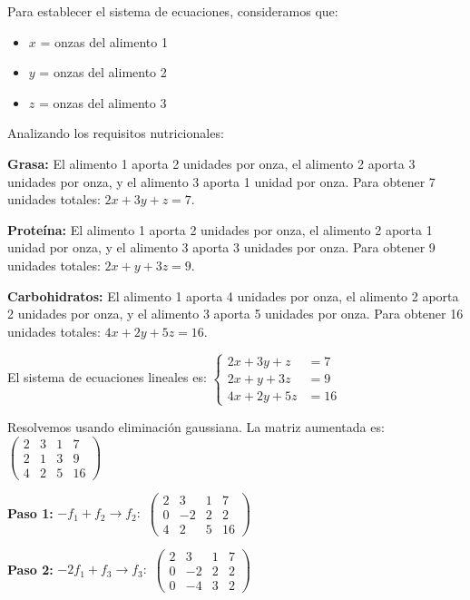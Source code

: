 \begin{myproof}
Para establecer el sistema de ecuaciones, consideramos que:
\begin{itemize}
\item $x$ = onzas del alimento 1
\item $y$ = onzas del alimento 2
\item $z$ = onzas del alimento 3
\end{itemize}

Analizando los requisitos nutricionales:

\textbf{Grasa:} El alimento 1 aporta 2 unidades por onza, el alimento 2 aporta 3 unidades por onza, y el alimento 3 aporta 1 unidad por onza. Para obtener 7 unidades totales: $2x + 3y + z = 7.$

\textbf{Proteína:} El alimento 1 aporta 2 unidades por onza, el alimento 2 aporta 1 unidad por onza, y el alimento 3 aporta 3 unidades por onza. Para obtener 9 unidades totales: $2x + y + 3z = 9.$

\textbf{Carbohidratos:} El alimento 1 aporta 4 unidades por onza, el alimento 2 aporta 2 unidades por onza, y el alimento 3 aporta 5 unidades por onza. Para obtener 16 unidades totales: $4x + 2y + 5z = 16.$

El sistema de ecuaciones lineales es:  $\begin{cases}
2x + 3y + z &= 7\\
2x + y + 3z &= 9\\
4x + 2y + 5z &= 16
\end{cases}$

Resolvemos usando eliminación gaussiana. La matriz aumentada es: $\left(\begin{array}{ccc|c}
2 & 3 & 1 & 7 \\
2 & 1 & 3 & 9 \\
4 & 2 & 5 & 16
\end{array}\right)$

\textbf{Paso 1:} $-f_1 + f_2 \to f_2:$ $\left(\begin{array}{ccc|c}
2 & 3 & 1 & 7 \\
0 & -2 & 2 & 2 \\
4 & 2 & 5 & 16
\end{array}\right)$

\textbf{Paso 2:} $-2f_1 + f_3 \to f_3:$ $\left(\begin{array}{ccc|c}
2 & 3 & 1 & 7 \\
0 & -2 & 2 & 2 \\
0 & -4 & 3 & 2
\end{array}\right)$


\end{myproof}
